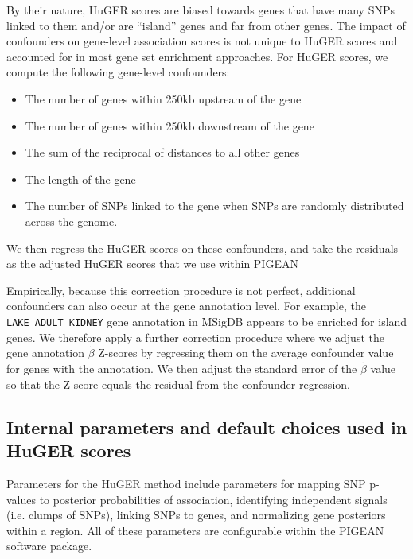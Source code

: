 \documentclass[11pt]{article}
\begin{document}
{By their nature, HuGER scores are biased towards genes that have many
SNPs linked to them and/or are ``island'' genes and far from other
genes. The impact of confounders on gene-level association scores is
not unique to HuGER scores and accounted for in most gene set
enrichment approaches\cite{}. For HuGER scores, we compute the
following gene-level confounders:
\begin{itemize}
  \item The number of genes within 250kb upstream of the gene
  \item The number of genes within 250kb downstream of the gene
  \item The sum of the reciprocal of distances to all other genes
  \item The length of the gene
  \item The number of SNPs linked to the gene when SNPs are randomly
    distributed across the genome.
\end{itemize}
We then regress the HuGER scores on these confounders, and take the
residuals as the adjusted HuGER scores that we use within PIGEAN

Empirically, because this correction procedure is not perfect, additional confounders can also occur at the gene annotation
level. For example, the \texttt{LAKE\_ADULT\_KIDNEY}\cite{} gene annotation in
MSigDB\cite{} appears to be enriched for island genes. We therefore
apply a further correction procedure where we adjust the gene annotation
$\tilde{\beta}$ Z-scores by regressing them on the average confounder value for
genes with the annotation. We then adjust the standard error of the
$\tilde{\beta}$ value so that the Z-score equals the residual from the
confounder regression.

\subsection{Internal parameters and default choices used in HuGER scores}

Parameters for the HuGER method include parameters for mapping SNP
p-values to posterior probabilities of association, identifying
independent signals (i.e. clumps of SNPs), linking SNPs to genes, and
normalizing gene posteriors within a region. All of these parameters
are configurable within the PIGEAN software package.

}
\end{document}
